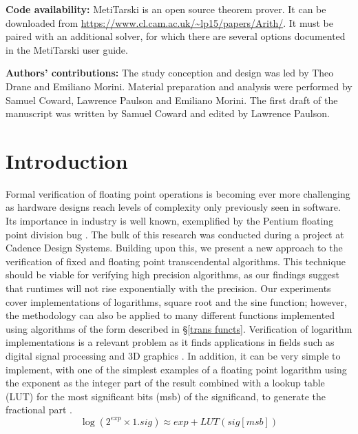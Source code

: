 \documentclass{fac}
\begin{document}
\noindent\textbf{Code availability:} MetiTarski is an open source theorem prover. It can be downloaded from
\newline \url{https://www.cl.cam.ac.uk/~lp15/papers/Arith/}. It must be paired with an additional solver, for which there are several options documented in the MetiTarski user guide.

\noindent\textbf{Authors' contributions:} The study conception and design was led by Theo Drane and Emiliano Morini. Material preparation and analysis were performed by Samuel Coward, Lawrence Paulson and Emiliano Morini. The first draft of the manuscript was written by Samuel Coward and edited by Lawrence Paulson.

\section{Introduction}
\label{intro}
Formal verification of floating point operations is becoming ever more challenging as hardware designs reach levels of complexity only previously seen in software. Its importance in industry is well known, exemplified by the Pentium floating point division bug \cite{pratt1995anatomy}. The bulk of this research was conducted during a project at Cadence Design Systems. Building upon this, we present a new approach to the verification of fixed and floating point transcendental algorithms. This technique should be viable for verifying high precision algorithms, as our findings suggest that runtimes will not rise exponentially with the precision.  Our experiments cover implementations of logarithms, square root and the sine function; however, the methodology can also be applied to many different functions implemented using algorithms of the form described in \S \ref{trans functs}. Verification of logarithm implementations is a relevant problem as it finds applications in fields such as digital signal processing and 3D graphics \cite{lewis1995114,harris2001powering}. In addition, it can be very simple to implement, with one of the simplest examples of a floating point logarithm using the exponent as the integer part of the result combined with a lookup table (LUT) for the most significant bits (msb) of the significand, to generate the fractional part \cite{harris2001powering}.
\begin{equation*}
    \log(2^{\textit{exp}} \times 1.sig) \approx \textit{exp} + LUT(\textit{sig}[msb])
\end{equation*}
\end{document}

